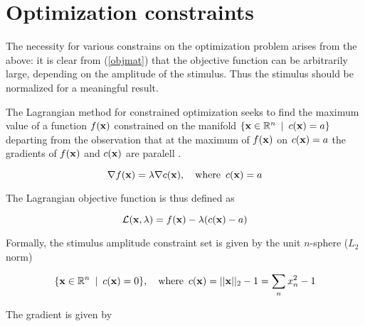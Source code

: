 \documentclass{article}
\newcommand{\Lagr}{\mathcal{L}}
\newcommand{\R}{\mathbb{R}}
\newcommand{\vect}[1]{\textbf{\textrm{#1}}}
\begin{document}
\section{Optimization constraints} \label{constraints}
The necessity for various constrains on the optimization problem arises from the above: it is clear from (\ref{objmat}) that the objective function can be arbitrarily large, depending on the amplitude of the stimulus. 
Thus the stimulus should be normalized for a meaningful result. \par
\hfill \newline
The Lagrangian method for constrained optimization seeks to find the maximum value of a function $f(\vect{x})$ constrained on the manifold $\lbrace \vect{x} \in \R^n \enspace | \enspace c(\vect{x}) = a \rbrace$ departing from the observation that at the maximum of $f(\vect{x})$ on $c(\vect{x}) = a$ the gradients of $f(\vect{x})$ and $c(\vect{x})$ are paralell \citep[ch.12]{nocedal2006}.

\begin{equation*}
	\nabla f(\vect{x}) = \lambda \nabla c(\vect{x}), \quad \text{where} \enspace c(\vect{x}) = a
\end{equation*}

The Lagrangian objective function is thus defined as

\begin{equation} \label{lagrangian}
	\Lagr(\vect{x},\lambda) = f(\vect{x}) - \lambda(c(\vect{x}) - a)
\end{equation}

\begin{comment}
Subject to multiple constraints

\begin{equation} \label{lagrangiannd}
	\Lagr(\vect{x}, \bm{\lambda}) = f(\vect{x}) - \sum_k{\lambda_k(c_k(\vect{x}) - a_k)}
\end{equation}
\end{comment}

Formally, the stimulus amplitude constraint set is given by the unit $n$-sphere ($L_2$ norm)

\begin{align}
	\lbrace \vect{x} \in \R^n \enspace | \enspace c(\vect{x}) = 0 \rbrace, \quad
	\text{where} \enspace c(\vect{x}) = ||\vect{x}||_2 - 1 = \sum_n{x_n^2} - 1
\end{align}

The gradient is given by
\end{document}
